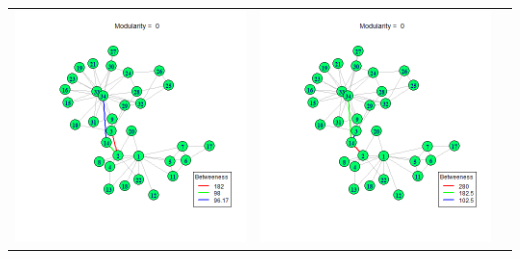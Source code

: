 \documentclass[letterpaper,11pt]{report}
\begin{document}
\begin{savenotes}
\begin{table}[htbp]
\begin{tabular}{ccc}
			\includegraphics[scale=0.25]{karateClub-community-0011.png} & 
			\includegraphics[scale=0.25]{karateClub-community-0012.png} \\

\end{tabular}
\end{table}
\end{savenotes}
\end{document}
